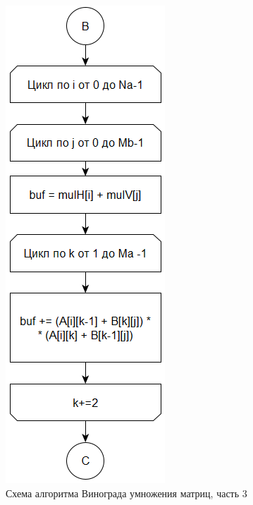 \documentclass[12pt]{report}
\begin{document}
\begin{figure}[h]
	\centering
	\includegraphics[scale=1.1]{p3.png}
	\caption{Схема алгоритма Винограда умножения матриц, часть 3}
	\label{fig:p3}
\end{figure}

\newpage
\end{document}
